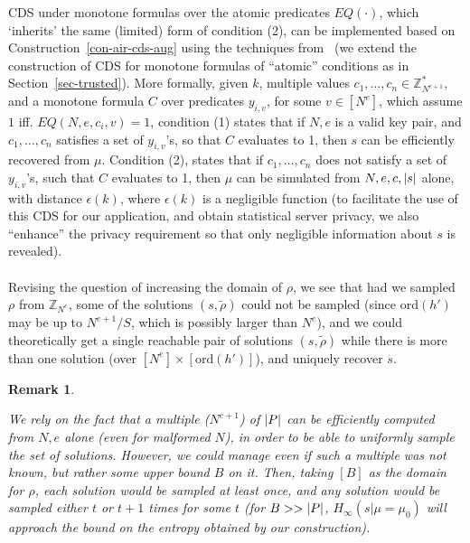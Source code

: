\documentclass[11pt]{article}
\newtheorem{Remark}[theorem]{Remark}
\newenvironment{remark}{\begin{Remark}\begin{rm}}{\end{rm}\end{Remark}}
\newcommand{\eps}{{\epsilon}}
\newcommand{\Z}{\mathbb{Z}}
\newcommand{\U}[1]{\mathbb{Z}_{#1}^*}
\newcommand{\ciph}{{C}}
\newcommand{\ciphtext}[1]{\ciph_{#1}}
\newcommand{\mathify}[1]{\ifmmode{#1}\else\mbox{$#1$}\fi}
\newcommand{\opbrange}[3][,]{#2#1\ldots#1#3}
\newcommand{\size}[1]{\mathify{\left| #1 \right|}}
\newcommand{\order}{{\mathrm{ord}}}
\begin{document}
CDS under monotone formulas over the atomic predicates $EQ(\cdot)$, which `inherits' the same (limited) form of condition (2), can be implemented based on Construction~\ref{con-air-cds-aug} using the techniques from~\cite{AIR01,GIKM} (we extend the construction of CDS for monotone formulas of ``atomic'' 
conditions as in Section~\ref{sec-trusted}).
More formally, given $k$, multiple values $\opbrange{c_1}{c_n}\in\U{N^{e+1}}$, and a monotone formula $C$ over predicates $y_{i,v}$, for some $v\in[N^e]$, which assume $1$ iff. $EQ(N,e,c_i,v)=1$, condition (1) states that if $N,e$ is a valid key pair, and $\opbrange{c_1}{c_n}$ satisfies a set of $y_{i,v}$'s, so that $C$ evaluates to 1, then $s$ can be efficiently recovered from $\mu$. Condition (2), states that if $\opbrange{c_1}{c_n}$ does not satisfy a set of $y_{i,v}$'s, such that $C$ evaluates to 1, then $\mu$ can be simulated from $N,e,c,\size{s}$ alone, with distance $\eps(k)$, where $\eps(k)$ is a negligible function (to facilitate the use of this CDS
for our application, and obtain statistical server privacy, we also ``enhance'' the privacy requirement so that only negligible information about $s$ is revealed).
\paragraph{}Revising the question of increasing the domain of $\rho$, we see that had we sampled $\rho$ from $\Z_{N^e}$, some of the solutions $(s,\tilde{\rho})$ could not be sampled (since $\order(h')$ may be up to $N^{e+1}/S$, which is possibly larger than $N^e$), and we could theoretically get a single reachable pair of solutions $(s,\tilde{\rho})$ while there is more than one solution (over $[N^e]\times[\order(h')]$), and uniquely recover $s$.
\begin{remark}%
  We rely on the fact that a multiple ($N^{e+1}$) of $\size{P}$ can be efficiently
  computed from $N,e$ alone (even for malformed $N$), in order to be able to uniformly sample the set
  of solutions. However, we could manage even if such a multiple was not known, but rather some upper bound
  $B$ on it. Then, taking $[B]$ as the domain for $\rho$, each solution would be sampled at least once,
  and any solution would be sampled either $t$ or $t+1$ times for some $t$ (for $B>>\size{P}$, $H_{\infty}(s|\mu=\mu_0)$ will approach the bound on the entropy obtained by our construction).
\end{remark}
\end{document}
